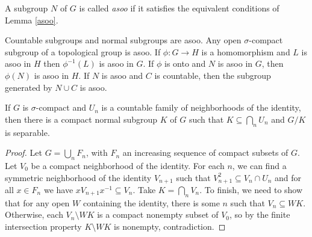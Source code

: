 \begin{defn} A subgroup $N$ of $G$ is called \emph{asoo} if it satisfies the equivalent conditions of Lemma \ref{asoo}.
\end{defn}

\begin{prop} Countable subgroups and normal subgroups are asoo. Any open $\sigma$-compact subgroup of a topological group is asoo. If $\phi : G \rightarrow H$ is a homomorphism and $L$ is asoo in $H$ then $\phi^{-1}(L)$ is asoo in $G$. If $\phi$ is onto and $N$ is asoo in $G$, then $\phi(N)$ is asoo in $H$. If $N$ is asoo and $C$ is countable, then the subgroup generated by $N \cup C$ is asoo.
\end{prop}

\begin{prop} If $G$ is $\sigma$-compact and $U_n$ is a countable family of neighborhoods of the identity, then there is a compact normal subgroup $K$ of $G$ such that $K \subseteq \bigcap_n U_n$ and $G/K$ is separable.
\end{prop}
\begin{proof} Let $G = \bigcup_n F_n$, with $F_n$ an increasing sequence of compact subsets of $G$. Let $V_0$ be a compact neighborhood of the identity. For each $n$, we can find a symmetric neighborhood of the identity $V_{n+1}$ such that $V_{n+1}^2 \subseteq V_n \cap U_n$ and for all $x \in F_n$ we have $xV_{n+1}x^{-1} \subseteq V_n$. Take $K = \bigcap_n V_n$. To finish, we need to show that for any open $W$ containing the identity, there is some $n$ such that $V_n \subseteq WK$. Otherwise, each $V_n \setminus WK$ is a compact nonempty subset of $V_0$, so by the finite intersection property $K \setminus WK$ is nonempty, contradiction.
\end{proof}

